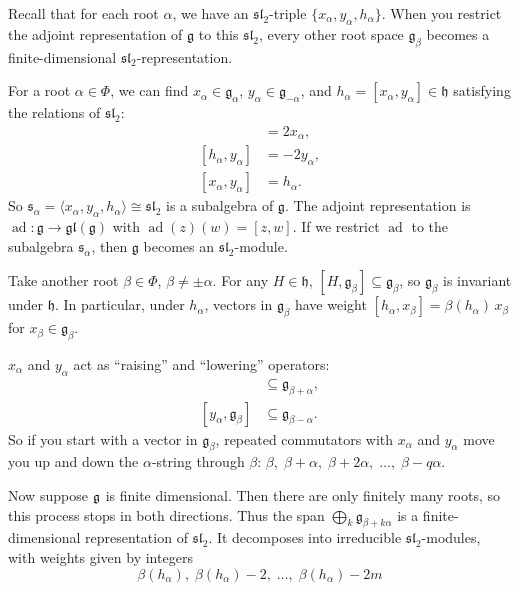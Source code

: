 \documentclass[12pt]{article}
\begin{document}
\begin{remark}
    Recall that for each root $\alpha$, we have an $\mathfrak{sl}_2$-triple $\{x_\alpha, y_\alpha, h_\alpha\}$. When you restrict the adjoint representation of $\mathfrak{g}$ to this $\mathfrak{sl}_2$, every other root space $\mathfrak{g}_\beta$ becomes a finite-dimensional $\mathfrak{sl}_2$-representation.

    For a root $\alpha \in \Phi$, we can find $x_\alpha \in \mathfrak{g}_\alpha$, $y_\alpha \in \mathfrak{g}_{-\alpha}$, and $h_\alpha = [x_\alpha, y_\alpha] \in \mathfrak{h}$ satisfying the relations of $\mathfrak{sl}_2$:
    \begin{align*}
        [h_\alpha, x_\alpha] & = 2x_\alpha,  \\
        [h_\alpha, y_\alpha] & = -2y_\alpha, \\
        [x_\alpha, y_\alpha] & = h_\alpha.
    \end{align*}
    So $\mathfrak{s}_\alpha = \langle x_\alpha, y_\alpha, h_\alpha\rangle \cong \mathfrak{sl}_2$ is a subalgebra of $\mathfrak{g}$. The adjoint representation is $\operatorname{ad}: \mathfrak{g} \to \mathfrak{gl}(\mathfrak{g})$ with $\operatorname{ad}(z)(w) = [z, w]$. If we restrict $\operatorname{ad}$ to the subalgebra $\mathfrak{s}_\alpha$, then $\mathfrak{g}$ becomes an $\mathfrak{sl}_2$-module.

    Take another root $\beta \in \Phi$, $\beta \neq \pm\alpha$. For any $H \in \mathfrak{h}$, $[H, \mathfrak{g}_\beta] \subseteq \mathfrak{g}_\beta$, so $\mathfrak{g}_\beta$ is invariant under $\mathfrak{h}$. In particular, under $h_\alpha$, vectors in $\mathfrak{g}_\beta$ have weight $[h_\alpha, x_\beta] = \beta(h_\alpha)\,x_\beta$ for $x_\beta \in \mathfrak{g}_\beta$.

    $x_\alpha$ and $y_\alpha$ act as “raising” and “lowering” operators:
    \begin{align*}
        [x_\alpha, \mathfrak{g}_\beta] & \subseteq \mathfrak{g}_{\beta+\alpha}, \\
        [y_\alpha, \mathfrak{g}_\beta] & \subseteq \mathfrak{g}_{\beta-\alpha}.
    \end{align*}
    So if you start with a vector in $\mathfrak{g}_\beta$, repeated commutators with $x_\alpha$ and $y_\alpha$ move you up and down the $\alpha$-string through $\beta$: $\beta, \;\beta+\alpha, \;\beta+2\alpha, \;\dots,\;\beta-q\alpha$.

    Now suppose $\mathfrak{g}$ is finite dimensional. Then there are only finitely many roots, so this process stops in both directions. Thus the span $\bigoplus_{k} \mathfrak{g}_{\beta+k\alpha}$ is a finite-dimensional representation of $\mathfrak{sl}_2$. It decomposes into irreducible $\mathfrak{sl}_2$-modules, with weights given by integers \[\beta(h_\alpha),\;\beta(h_\alpha)-2,\;\dots,\;\beta(h_\alpha)-2m\]


\end{remark}
\end{document}
